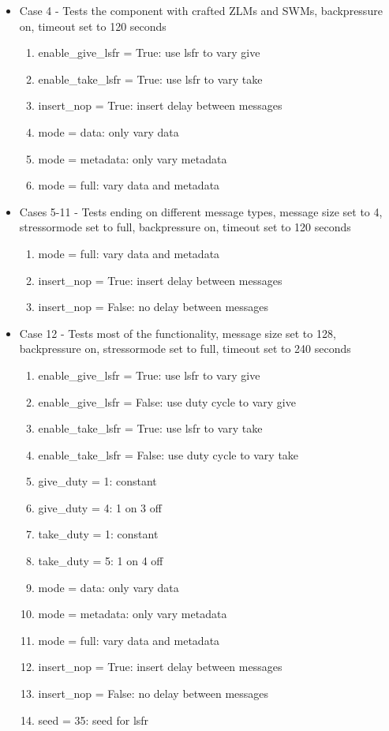 \begin{flushleft}
\begin{itemize}
\item Case 4 - Tests the component with crafted ZLMs and SWMs, backpressure on, timeout set to 120 seconds
\begin{enumerate}
	\item enable\_give\_lsfr = True: use lsfr to vary give
	\item enable\_take\_lsfr = True: use lsfr to vary take
	\item insert\_nop = True: insert delay between messages
  \item mode = data: only vary data
	\item mode = metadata: only vary metadata
	\item mode = full: vary data and metadata
\end{enumerate}

\item Cases 5-11 - Tests ending on different message types, message size set to 4, stressormode set to full, backpressure on, timeout set to 120 seconds
\begin{enumerate}
	\item mode = full: vary data and metadata
	\item insert\_nop = True: insert delay between messages
	\item insert\_nop = False: no delay between messages
\end{enumerate}

\item Case 12 -  Tests most of the functionality, message size set to 128, backpressure on, stressormode set to full, timeout set to 240 seconds
\begin{enumerate}
	\item enable\_give\_lsfr = True: use lsfr to vary give
	\item enable\_give\_lsfr = False: use duty cycle to vary give
	\item enable\_take\_lsfr = True: use lsfr to vary take
	\item enable\_take\_lsfr = False: use duty cycle to vary take
	\item give\_duty = 1: constant
	\item give\_duty = 4: 1 on 3 off
	\item take\_duty = 1: constant
	\item take\_duty = 5: 1 on 4 off
	\item mode = data: only vary data
	\item mode = metadata: only vary metadata
	\item mode = full: vary data and metadata
	\item insert\_nop = True: insert delay between messages
	\item insert\_nop = False: no delay between messages
	\item seed = 35: seed for lsfr
\end{enumerate}


\end{itemize}
\end{flushleft}
